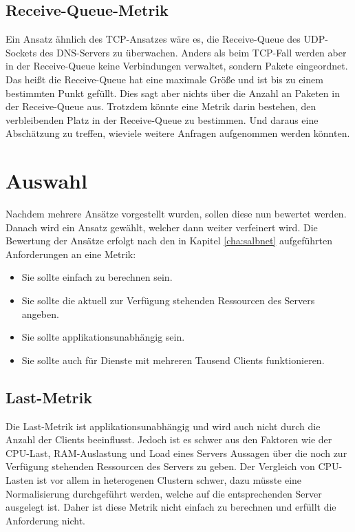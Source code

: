 \documentclass[a4paper, 12pt, BCOR10mm, DIV12, toc=bibliography, toc=listof, german]{scrbook}
\begin{document}

		\subsection*{Receive-Queue-Metrik} %
	
		Ein Ansatz ähnlich des TCP-Ansatzes wäre es, die Receive-Queue des UDP-Sockets des DNS-Servers zu
		überwachen. Anders als beim TCP-Fall werden aber in der Receive-Queue keine Verbindungen
		verwaltet, sondern Pakete eingeordnet. Das heißt die Receive-Queue hat eine maximale Größe und
		ist bis zu einem bestimmten Punkt gefüllt. Dies sagt aber nichts über die Anzahl an Paketen in
		der Receive-Queue aus. Trotzdem könnte eine Metrik darin bestehen, den verbleibenden Platz in
		der Receive-Queue zu bestimmen. Und daraus eine Abschätzung zu treffen, wieviele weitere
		Anfragen aufgenommen werden könnten.

		

		\section{Auswahl} %
		\label{sec:auswahl}

		Nachdem mehrere Ansätze vorgestellt wurden, sollen diese nun bewertet werden. Danach wird ein
		Ansatz gewählt, welcher dann weiter verfeinert wird. Die Bewertung der Ansätze erfolgt nach den
		in Kapitel \ref{cha:salbnet} aufgeführten Anforderungen an eine Metrik:

		\begin{itemize}
			\item Sie sollte einfach zu berechnen sein.
			\item Sie sollte die aktuell zur Verfügung stehenden Ressourcen des Servers angeben.
			\item Sie sollte applikationsunabhängig sein.
			\item Sie sollte auch für Dienste mit mehreren Tausend Clients funktionieren.
		\end{itemize}

		\subsection*{Last-Metrik} %

		Die Last-Metrik ist applikationsunabhängig und wird auch nicht durch die Anzahl der Clients
		beeinflusst. Jedoch ist es schwer aus den Faktoren wie der CPU-Last, RAM-Auslastung und Load
		eines Servers Aussagen über die noch zur Verfügung stehenden Ressourcen des Servers zu geben.
		Der Vergleich von CPU-Lasten ist vor allem in heterogenen Clustern schwer, dazu müsste eine
		Normalisierung durchgeführt werden, welche auf die entsprechenden Server ausgelegt ist. Daher
		ist diese Metrik nicht einfach zu berechnen und erfüllt die Anforderung nicht.
		
\end{document}
